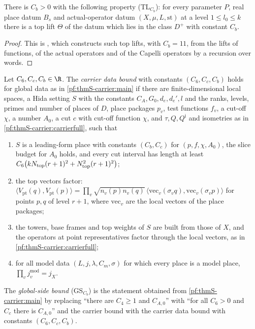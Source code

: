 \begin{lemma}\label{pf:thmS-carrier:liftat3}
There is $C_b>0$ with the following property (TL$_{C_b}$): for every parameter $P$, real place datum $B_s$ and
actual-operator datum $(X,\mu,L,\mathrm{st})$ at a level $1\le l_0\le k$ there is a top lift $\Theta$ of the datum which
lies in the class $D^+$ with constant $C_b$.
\end{lemma}

\begin{proof}
This is , which constructs such top lifts, with $C_b=11$, from the
lifts of functions, of the actual operators and of the Capelli operators by a recursion over words.
\end{proof}

\begin{definition}\label{pf:thmS-carrier:gsdef}
Let $C_6,C_c,C_b\in\R$. The \emph{carrier data bound} with constants $(C_6,C_c,C_b)$ holds for global data as in
\cref{pf:thmS-carrier:main} if there are finite-dimensional local spaces, a Hida setting $S$ with the constants
$C_A,G_0,d_e,d_e',l$ and the ranks, levels, primes and number of places of $D$, place packages $p_v$, test functions $f_v$, a
cut-off $\chi$, a number $A_0$, a cut $c$ with cut-off function $\chi$, and $\tau,Q,Q^{\mathrm i}$ and isometries as in
\cref{pf:thmS-carrier:carrierfull}, such that
\begin{enumerate}[label=(\roman*)]
\item $S$ is a leading-form place with constants $(C_b,C_c)$ for $(p,f,\chi,A_0)$, the slice budget for $A_0$ holds, and
  every cut interval has length at least $C_6\bigl(kN_{\mathrm{top}}(r+1)^2+N_{\mathrm{top}}^2(r+1)^2\bigr)$;
\item the top vectors factor: $\langle V_{\mathrm{pt}}(q),V_{\mathrm{pt}}(p)\rangle=\prod_v\sqrt{n_v(p)n_v(q)}\,
  \langle\mathrm{vec}_v(\sigma_vq),\mathrm{vec}_v(\sigma_vp)\rangle$ for points $p,q$ of level $r+1$, where
  $\mathrm{vec}_v$ are the local vectors of the place packages;
\item the towers, base frames and top weights of $S$ are built from those of $X$, and the operators at point
  representatives factor through the local vectors, as in \cref{pf:thmS-carrier:carrierfull};
\item for all model data $(L,j,\lambda,C_m,\sigma)$ for which every place is a model place, $\prod_vj^{\mathrm{mod}}_v
  =j_X$.
\end{enumerate}
The \emph{global-side bound} (GS$_{C_b}$) is the statement obtained from \cref{pf:thmS-carrier:main} by replacing ``there are
$C_4\ge1$ and $C_{A,0}$'' with ``for all $C_6>0$ and $C_c$ there is $C_{A,0}$'' and the carrier bound with the carrier data
bound with constants $(C_6,C_c,C_b)$.
\end{definition}

